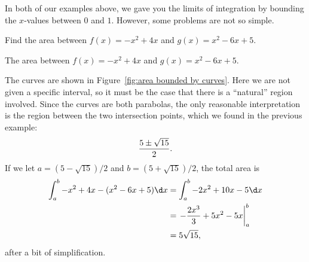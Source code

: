 \documentclass{ximera}
\begin{document}
In both of our examples above, we gave you the limits of integration
by bounding the $x$-values between $0$ and $1$. However, some problems
are not so simple.

\begin{example} Find the area between $f(x)= -x^2+4x$ and
$g(x)=x^2-6x+5$.
\end{example}

\begin{marginfigure}
\caption{The area between $f(x)= -x^2+4x$ and $g(x)=x^2-6x+5$.}
\label{fig:area bounded by curves}
\end{marginfigure}

\begin{solution}
The curves are shown in Figure~\ref{fig:area bounded by curves}. Here
we are not given a specific interval, so it must be the case that
there is a ``natural'' region involved. Since the curves are both
parabolas, the only reasonable interpretation is the region between
the two intersection points, which we found in the previous example:
$${5\pm\sqrt{15}\over2}.$$
If we let $a=(5-\sqrt{15})/2$ and $b=(5+\sqrt{15})/2$,
the total area is 
\begin{align*}
  \int_a^b -x^2+4x-(x^2-6x+5)\d x
  &=\int_a^b -2x^2+10x-5\d x \\
  &=\left.-{2x^3\over3}+5x^2-5x\right|_a^b \\
  &=5\sqrt{15},
\end{align*}
after a bit of simplification.
\end{solution}
\end{document}
